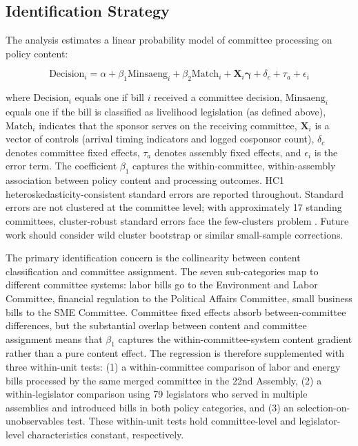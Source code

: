 \documentclass[11pt]{article}
\begin{document}
\subsection{Identification Strategy}
\label{sec:ident}

The analysis estimates a linear probability model of committee processing on policy content:

\begin{equation}
\text{Decision}_i = \alpha + \beta_1 \text{Minsaeng}_i + \beta_2 \text{Match}_i + \mathbf{X}_i \boldsymbol{\gamma} + \delta_c + \tau_a + \epsilon_i
\label{eq:main}
\end{equation}

\noindent where $\text{Decision}_i$ equals one if bill $i$ received a committee decision, $\text{Minsaeng}_i$ equals one if the bill is classified as livelihood legislation (as defined above), $\text{Match}_i$ indicates that the sponsor serves on the receiving committee, $\mathbf{X}_i$ is a vector of controls (arrival timing indicators and logged cosponsor count), $\delta_c$ denotes committee fixed effects, $\tau_a$ denotes assembly fixed effects, and $\epsilon_i$ is the error term. The coefficient $\beta_1$ captures the within-committee, within-assembly association between policy content and processing outcomes. HC1 heteroskedasticity-consistent standard errors are reported throughout. Standard errors are not clustered at the committee level; with approximately 17 standing committees, cluster-robust standard errors face the few-clusters problem \citep[see][for discussion]{cameron2000}. Future work should consider wild cluster bootstrap or similar small-sample corrections.

The primary identification concern is the collinearity between content classification and committee assignment. The seven sub-categories map to different committee systems: labor bills go to the Environment and Labor Committee, financial regulation to the Political Affairs Committee, small business bills to the SME Committee. Committee fixed effects absorb between-committee differences, but the substantial overlap between content and committee assignment means that $\beta_1$ captures the within-committee-system content gradient rather than a pure content effect. The regression is therefore supplemented with three within-unit tests: (1) a within-committee comparison of labor and energy bills processed by the same merged committee in the 22nd Assembly, (2) a within-legislator comparison using 79 legislators who served in multiple assemblies and introduced bills in both policy categories, and (3) an \citet{oster2019} selection-on-unobservables test. These within-unit tests hold committee-level and legislator-level characteristics constant, respectively.
\end{document}
